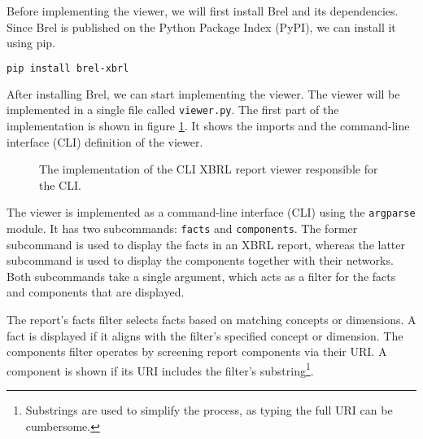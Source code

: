 Before implementing the viewer, we will first install Brel and its dependencies.
Since Brel is published on the Python Package Index (PyPI), we can install it using pip.

\begin{lstlisting}[language=bash]
pip install brel-xbrl
\end{lstlisting}

After installing Brel, we can start implementing the viewer.
The viewer will be implemented in a single file called \texttt{viewer.py}.
The first part of the implementation is shown in figure \ref{fig:viewer_1}.
It shows the imports and the command-line interface (CLI) definition of the viewer.

\begin{figure}[H]
    \centering
    
    \caption{The implementation of the CLI XBRL report viewer responsible for the CLI.}
    \label{fig:viewer_1}
\end{figure}


The viewer is implemented as a command-line interface (CLI) using the \texttt{argparse} module.
It has two subcommands: \texttt{facts} and \texttt{components}.
The former subcommand is used to display the facts in an XBRL report, 
whereas the latter subcommand is used to display the components together with their networks.
Both subcommands take a single argument, which acts as a filter for the facts and components that are displayed.

The report's facts filter selects facts based on matching concepts or dimensions.
A fact is displayed if it aligns with the filter's specified concept or dimension.
The components filter operates by screening report components via their URI.
A component is shown if its URI includes the filter's substring\footnote{Substrings are used to simplify the process, as typing the full URI can be cumbersome.}.

